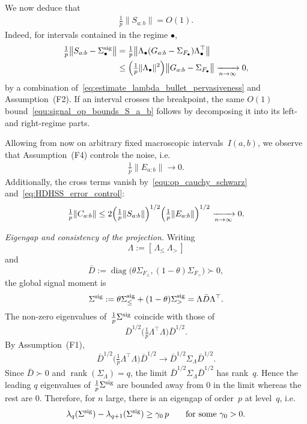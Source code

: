 \documentclass[10pt, letterpaper]{amsart}
\begin{document}
We now deduce that
\begin{align}\label{equ:signal_op_bounds_S_a_b}
\tfrac1p\|S_{a:b}\|=O(1).
\end{align}
Indeed, for intervals contained in the regime $\bullet$,
\begin{align}\label{equ:signal_block_estimate}
\tfrac1p\bigl\|S_{a:b}-\Sigma_\bullet^{\rm sig}\bigr\|
& =
\tfrac1p\bigl\|\Lambda_\bullet(G_{a:b}-\Sigma_{F_\bullet})\Lambda_\bullet^{\top}\bigr\| \\
& \le
\Bigl(\tfrac1p\|\Lambda_\bullet\|^2\Bigr)
\bigl\|G_{a:b}-\Sigma_{F_\bullet}\bigr\|
\xrightarrow[n\to\infty]{}0,
\end{align}
by a combination of~\eqref{eq:estimate_lambda_bullet_pervasiveness} and Assumption~(F2). If an interval crosses the breakpoint, the same $O(1)$ bound~\eqref{equ:signal_op_bounds_S_a_b} follows by decomposing it into its left- and right-regime parts.

Allowing from now on arbitrary fixed macroscopic intervals~$I(a,b)$, we observe that Assumption~(F4) controls the noise, i.e.
\begin{align}
\label{eq:HDHSS_error_control}
\tfrac1p\|E_{a:b}\|\to0.
\end{align}
 Additionally, the cross terms vanish by~\eqref{equ:op_cauchy_schwarz} and~\eqref{eq:HDHSS_error_control}:
\begin{align}\label{equ:cross_estimate}
\tfrac1p\|C_{a:b}\|
\le
2\Bigl(\tfrac1p\|S_{a:b}\|\Bigr)^{1/2}
\Bigl(\tfrac1p\|E_{a:b}\|\Bigr)^{1/2}
\xrightarrow[n\to\infty]{}0.
\end{align}

\smallskip

\noindent\emph{Eigengap and consistency of the projection.}
Writing
\[
\Lambda:=[\,\Lambda_\le\ \Lambda_>\,]
\]
and
\[
\bar D:=\operatorname{diag}\bigl(\theta\Sigma_{F_\le},(1-\theta)\Sigma_{F_>}\bigr)\succ0,
\]
the global signal moment is
\begin{align}
\Sigma^{\rm sig}
:=
\theta\Sigma_\le^{\rm sig}+(1-\theta)\Sigma_>^{\rm sig}
=
\Lambda\bar D\Lambda^{\top}.
\end{align}
The non-zero eigenvalues of~$\frac{1}{p}\Sigma^{\rm sig}$ coincide with those of
\[
\bar D^{1/2}\bigl(\tfrac1p\Lambda^{\top}\Lambda\bigr)\bar D^{1/2}.
\]
By Assumption~(F1),
\[
\bar D^{1/2}\bigl(\tfrac1p\Lambda^{\top}\Lambda\bigr)\bar D^{1/2}
\longrightarrow
\bar D^{1/2}\Sigma_\Lambda\bar D^{1/2}.
\]
Since $\bar D\succ0$ and $\operatorname{rank}(\Sigma_\Lambda)=q$, the limit
$\bar D^{1/2}\Sigma_\Lambda\bar D^{1/2}$ has rank~$q$. Hence the leading \(q\) eigenvalues of \(\frac{1}{p}\Sigma^{\rm sig}\) are bounded away from \(0\) in the limit whereas the rest are \(0\). Therefore, for $n$ large, there is an eigengap of order~$p$ at level~$q$, i.e.
\begin{align}\label{equ:eigengap_signal}
\lambda_q(\Sigma^{\rm sig})-\lambda_{q+1}(\Sigma^{\rm sig})
\ge
\gamma_0\,p
\qquad\text{for some }\gamma_0>0 .
\end{align}
\end{document}
